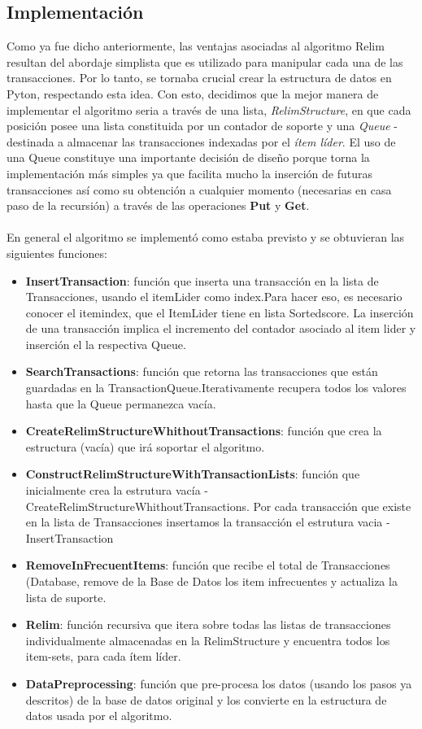 \documentclass[12pt,spanish]{article}
\begin{document}
\subsection{Implementación}

Como ya fue dicho anteriormente, las ventajas asociadas al algoritmo Relim resultan del abordaje simplista que es utilizado para manipular cada una de las transacciones. Por lo tanto, se tornaba crucial crear la estructura de datos en Pyton, respectando esta idea. Con esto, decidimos que la mejor manera de implementar el algoritmo seria a través de una lista, \emph{RelimStructure}, en que cada posición posee una lista constituida por un contador de soporte y una \emph{Queue} - destinada a almacenar las transacciones  indexadas por el \emph{ítem líder}. El uso de una Queue constituye una importante decisión de diseño  porque torna la implementación más simples ya que facilita mucho la inserción de futuras transacciones así como su obtención a cualquier momento (necesarias en casa paso de la recursión) a través de las operaciones \textbf{Put} y \textbf{Get}. 
\\\\
En general el algoritmo se implementó como estaba previsto y se obtuvieran las siguientes funciones:    

\begin{itemize}
\renewcommand{\labelitemi}{$\bullet$}
\item\textbf{InsertTransaction}:
función que inserta una transacción en la lista de Transacciones, usando el itemLider como index.Para hacer eso, es necesario conocer el itemindex, que el ItemLider tiene en lista Sortedscore. La inserción de una transacción implica el incremento del contador asociado al item lider y inserción el la respectiva Queue.
\item \textbf{SearchTransactions}:
función que retorna las transacciones que están guardadas en la TransactionQueue.Iterativamente recupera todos los valores hasta que la Queue permanezca vacía.
\item \textbf{CreateRelimStructureWhithoutTransactions}:
función que crea la estructura (vacía) que irá soportar el algoritmo.
\item \textbf{ConstructRelimStructureWithTransactionLists}:
función que inicialmente crea la estrutura vacía -
CreateRelimStructureWhithoutTransactions. Por cada transacción que existe en la lista de Transacciones insertamos la transacción el estrutura vacia -InsertTransaction
\item \textbf{RemoveInFrecuentItems}:
función que recibe el total de Transacciones (Database, remove de la Base de Datos los item infrecuentes y actualiza la lista de suporte.
\item \textbf{Relim}:
función recursiva que itera sobre todas las listas de transacciones individualmente almacenadas en la RelimStructure y encuentra todos los item-sets, para cada ítem líder.
\item \textbf{DataPreprocessing}:
función que pre-procesa los datos (usando los pasos ya descritos) de la base de datos original y los convierte en la estructura de datos usada por el algoritmo.
\end{itemize}
\end{document}
